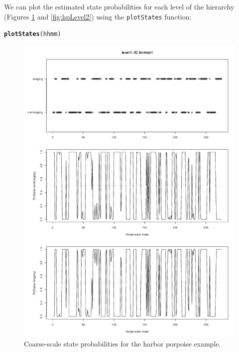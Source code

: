 \documentclass[12pt]{article}\usepackage[]{graphicx}\usepackage[]{xcolor}
\makeatletter
\newcommand{\hlstd}[1]{\textcolor[rgb]{0.345,0.345,0.345}{#1}}%
\newcommand{\hlkwd}[1]{\textcolor[rgb]{0.737,0.353,0.396}{\textbf{#1}}}%
\newenvironment{kframe}{%
 \def\at@end@of@kframe{}%
 \ifinner\ifhmode%
  \def\at@end@of@kframe{\end{minipage}}%
  \begin{minipage}{\columnwidth}%
 \fi\fi%
 \def\FrameCommand##1{\hskip\@totalleftmargin \hskip-\fboxsep
 \colorbox{shadecolor}{##1}\hskip-\fboxsep
     \hskip-\linewidth \hskip-\@totalleftmargin \hskip\columnwidth}%
 \MakeFramed {\advance\hsize-\width
   \@totalleftmargin\z@ \linewidth\hsize
   \@setminipage}}%
 {\par\unskip\endMakeFramed%
 \at@end@of@kframe}
\newenvironment{knitrout}{}{} %
\makeatother
\begin{document}
We can plot the estimated state probabilities for each level of the hierarchy (Figures \ref{fig:hpLevel1} and \ref{fig:hpLevel2}) using the \verb|plotStates| function:
\begin{knitrout}
\color{fgcolor}\begin{kframe}
\begin{alltt}
\hlkwd{plotStates}\hlstd{(hhmm)}
\end{alltt}
\end{kframe}
\end{knitrout}
\begin{figure}[htbp]
  \centering
  \includegraphics[width=\textwidth]{plot_harborPorpoiseStates001.pdf}
  \caption{Coarse-scale state probabilities for the harbor porpoise example.}
  \label{fig:hpLevel1}
\end{figure}
\end{document}
